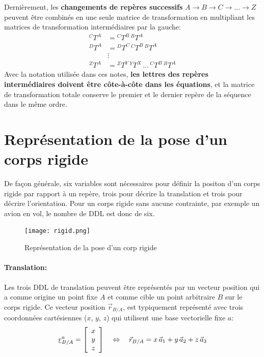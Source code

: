 Dernièrement, les \textbf{changements de repères successifs} $A \rightarrow B \rightarrow C \rightarrow ... \rightarrow Z$  peuvent être combinés en une seule matrice de transformation en multipliant les matrices de transformation intermédiaires par la gauche:
\begin{align}
{}^CT^A &=  {}^CT^B \, {}^BT^A \\
{}^DT^A &=  {}^DT^C \, {}^CT^B \, {}^BT^A \\
& \vdots \nonumber \\
{}^ZT^A &= {}^ZT^Y \, {}^YT^X \, ... \, {}^CT^B \,  {}^BT^A 
\end{align} 
Avec la notation utilisée dans ces notes, \textbf{les lettres des repères intermédiaires doivent être côte-à-côte dans les équations}, et la matrice de transformation totale conserve le premier et le dernier repère de la séquence dans le même ordre. 




\newpage
\section{Représentation de la pose d'un corps rigide}
\label{sec:corps}

De façon générale, six variables sont nécessaires pour définir la positon d'un corps rigide par rapport à un repère, trois pour décrire la translation et trois pour décrire l'orientation. Pour un corps rigide sans aucune contrainte, par exemple un avion en vol, le nombre de DDL est donc de six. 

\begin{figure}[H]
	\centering
		\texttt{[image: rigid.png]}
	\caption{Représentation de la pose d'un corp rigide}
	\label{fig:rigid}
\end{figure}


\paragraph{Translation:}
%
Les trois DDL de translation peuvent être représentés par un vecteur position qui a comme origine un point fixe $A$ et comme cible un point arbitraire $B$ sur le corps rigide. Ce vecteur position $\vec{r}_{B/A}$, est typiquement représenté avec trois coordonnées cartésiennes ($x$, $y$, $z$) qui utilisent une base vectorielle fixe $a$:
\begin{equation}
\underline{r}_{B/A}^a = \left[ \begin{array}{c} x \\  y \\ z  \end{array} \right]
\quad \Leftrightarrow  \quad 
\vec{r}_{B/A} = x \, \vec{a}_1 + y \, \vec{a}_2 + z \, \vec{a}_3
\end{equation} 

